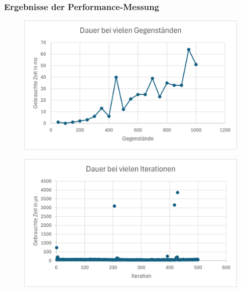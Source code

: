 \begin{itemize}
\subsubsection*{Ergebnisse der Performance-Messung}
\begin{figure}[H]
\centering
\begin{minipage}[b]{0.45\textwidth}
\centering
\includegraphics[width=\textwidth]{images/exclGeg}
\label{fig:exclGeg}
\end{minipage}
\hfill
\begin{minipage}[b]{0.45\textwidth}
\centering
\includegraphics[width=\textwidth]{images/exclIte}
\label{fig:exclIte}
\end{minipage}
\end{figure}


\end{itemize}
